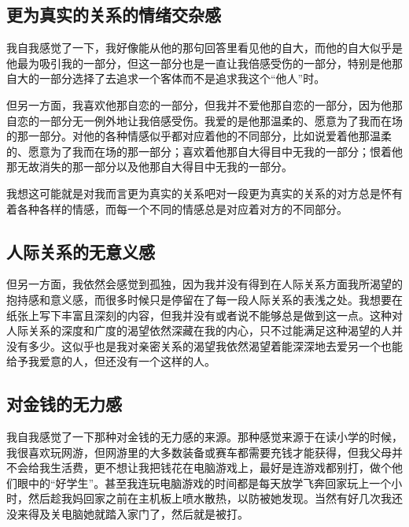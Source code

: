 
\subsection*{更为真实的关系的情绪交杂感}

我自我感觉了一下，我好像能从他的那句回答里看见他的自大，而他的自大似乎是他最为吸引我的一部分，但这一部分也是一直让我倍感受伤的一部分，特别是他那自大的一部分选择了去追求一个客体而不是追求我这个“他人”时。

但另一方面，我喜欢他那自恋的一部分，但我并不爱他那自恋的一部分，因为他那自恋的一部分无一例外地让我倍感受伤。我爱的是他那温柔的、愿意为了我而在场的那一部分。对他的各种情感似乎都对应着他的不同部分，比如说爱着他那温柔的、愿意为了我而在场的那一部分；喜欢着他那自大得目中无我的一部分；恨着他那无故消失的那一部分以及他那自大得目中无我的一部分。

我想这可能就是对我而言更为真实的关系吧\pozhehao{}对一段更为真实的关系的对方总是怀有着各种各样的情感，而每一个不同的情感总是对应着对方的不同部分。


\subsection*{人际关系的无意义感}

但另一方面，我依然会感觉到孤独，因为我并没有得到在人际关系方面我所渴望的抱持感和意义感，而很多时候只是停留在了每一段人际关系的表浅之处。我想要在纸张上写下丰富且深刻的内容，但我并没有或者说不能够总是做到这一点。这种对人际关系的深度和广度的渴望依然深藏在我的内心，只不过能满足这种渴望的人并没有多少。这似乎也是我对亲密关系的渴望\pozhehao{}我依然渴望着能深深地去爱另一个也能给予我爱意的人，但还没有一个这样的人。


\subsection*{对金钱的无力感}

我自我感觉了一下那种对金钱的无力感的来源。那种感觉来源于在读小学的时候，我很喜欢玩网游，但网游里的大多数装备或赛车都需要充钱才能获得，但我父母并不会给我生活费，更不想让我把钱花在电脑游戏上，最好是连游戏都别打，做个他们眼中的“好学生”。甚至我连玩电脑游戏的时间都是每天放学飞奔回家玩上一个小时，然后趁我妈回家之前在主机板上喷水散热，以防被她发现。当然有好几次我还没来得及关电脑她就踏入家门了，然后就是被打。

